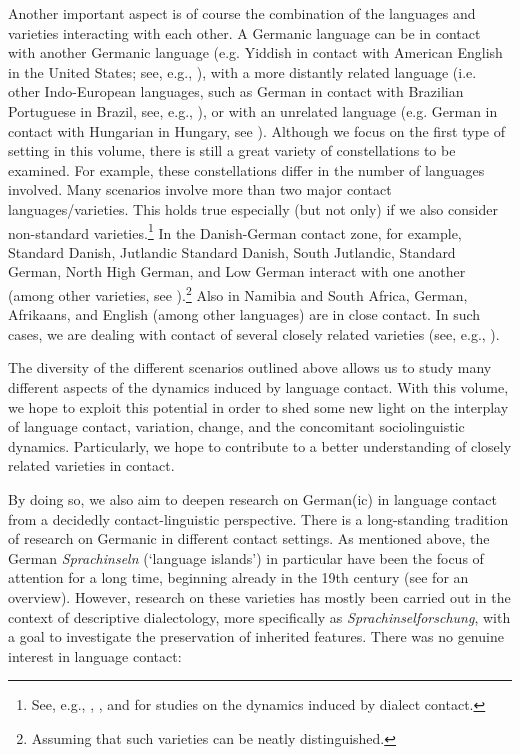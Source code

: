 \documentclass[output=paper]{langsci/langscibook}
\begin{document}
Another important aspect is of course the combination of the languages and varieties interacting with each other. A Germanic language can be in contact with another Germanic language (e.g. Yiddish in contact with American English in the United States; see, e.g., ), with a more distantly related language (i.e. other Indo-European languages, such as German in contact with Brazilian Portuguese in Brazil, see, e.g., \citealt{rosenberg_comparative_2003}), or with an unrelated language (e.g. German in contact with Hungarian in Hungary, see \citealt{knipf-komlosi_ungarn_2008}). Although we focus on the first type of setting in this volume, there is still a great variety of constellations to be examined. For example, these constellations differ in the number of languages involved. Many scenarios involve more than two major contact languages/varieties. This holds true especially (but not only) if we also consider non-standard varieties.\footnote{See, e.g., \citet{schirmunski_sprachgeschichte_1930}, \citet{trudgill_dialects_1986}, and \citet{rosenberg_dialect_2005} for studies on the dynamics induced by dialect contact.} In the Danish-German contact zone, for example, Standard Danish, Jutlandic Standard Danish, South Jutlandic, Standard German, North High German, and Low German interact with one another (among other varieties, see ).\footnote{Assuming that such varieties can be neatly distinguished.} Also in Namibia and South Africa, German, Afrikaans, and English (among other languages) are in close contact. In such cases, we are dealing with contact of several closely related varieties (see, e.g., \citealt{zimmer_deutsch_2019}).

The diversity of the different scenarios outlined above allows us to study many different aspects of the dynamics induced by language contact. With this volume, we hope to exploit this potential in order to shed some new light on the interplay of language contact, variation, change, and the concomitant sociolinguistic dynamics. Particularly, we hope to contribute to a better understanding of closely related varieties in contact. 

By doing so, we also aim to deepen research on German(ic) in language contact from a decidedly contact-linguistic perspective. There is a long-standing tradition of research on Germanic in different contact settings. As mentioned above, the German \textit{Sprachinseln} (‘language islands’) in particular have been the focus of attention for a long time, beginning already in the 19th century (see \citealt{rosenberg_dialect_2005} for an overview). However, research on these varieties has mostly been carried out in the context of descriptive dialectology, more specifically as \textit{Sprachinselforschung}, with a goal to investigate the preservation of inherited features. There was no genuine interest in language contact:
\end{document}
